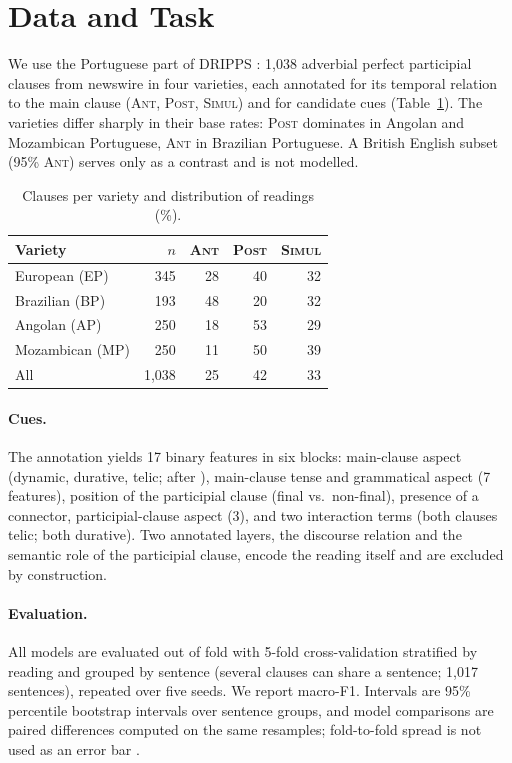 \documentclass[11pt]{article}
\begin{document}
\section{Data and Task}
\label{sec:data}

We use the Portuguese part of DRIPPS \citep{silvano2023dripps}: 1,038 adverbial perfect participial clauses from newswire in four varieties, each annotated for its temporal relation to the main clause (\textsc{Ant}, \textsc{Post}, \textsc{Simul}) and for candidate cues (Table~\ref{tab:data}). The varieties differ sharply in their base rates: \textsc{Post} dominates in Angolan and Mozambican Portuguese, \textsc{Ant} in Brazilian Portuguese. A British English subset (95\% \textsc{Ant}) serves only as a contrast and is not modelled.

\begin{table}[t]
\centering\small
\begin{tabular}{lrrrr}
\toprule
Variety & $n$ & \textsc{Ant} & \textsc{Post} & \textsc{Simul} \\
\midrule
European (EP) & 345 & 28 & 40 & 32 \\
Brazilian (BP) & 193 & 48 & 20 & 32 \\
Angolan (AP) & 250 & 18 & 53 & 29 \\
Mozambican (MP) & 250 & 11 & 50 & 39 \\
\midrule
All & 1,038 & 25 & 42 & 33 \\
\bottomrule
\end{tabular}
\caption{Clauses per variety and distribution of readings (\%).}
\label{tab:data}
\end{table}

\paragraph{Cues.} The annotation yields 17 binary features in six blocks: main-clause aspect (dynamic, durative, telic; after \citealp{moens-steedman-1988-temporal}), main-clause tense and grammatical aspect (7 features), position of the participial clause (final vs.\ non-final), presence of a connector, participial-clause aspect (3), and two interaction terms (both clauses telic; both durative). Two annotated layers, the discourse relation and the semantic role of the participial clause, encode the reading itself and are excluded by construction.

\paragraph{Evaluation.} All models are evaluated out of fold with 5-fold cross-validation stratified by reading and grouped by sentence (several clauses can share a sentence; 1,017 sentences), repeated over five seeds. We report macro-F1. Intervals are 95\% percentile bootstrap intervals over sentence groups, and model comparisons are paired differences computed on the same resamples; fold-to-fold spread is not used as an error bar \citep{varoquaux2018}.
\end{document}

